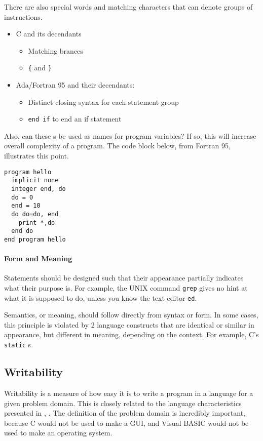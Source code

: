 There are also special words and matching characters that can denote groups of instructions.
\begin{itemize}[noitemsep]
\item C and its decendants
  \begin{itemize}[noitemsep]
  \item Matching brances
  \item \texttt{\{} and \texttt{\}}
  \end{itemize}
\item Ada/Fortran 95 and their decendants:
  \begin{itemize}[noitemsep]
  \item Distinct closing syntax for each statement group
  \item \texttt{end if} to end an if statement
  \end{itemize}
\end{itemize}

Also, can these s be used as names for program variables?
If so, this will increase overall complexity of a program.
The code block below, from Fortran 95, illustrates this point.
\begin{verbatim}
program hello
  implicit none
  integer end, do
  do = 0
  end = 10
  do do=do, end
    print *,do
  end do
end program hello
\end{verbatim}

\paragraph{Form and Meaning}\label{par:Syntax_Form_Meaning}
Statements should be designed such that their appearance partially indicates what their purpose is.
For example, the UNIX command \texttt{grep} gives no hint at what it is supposed to do, unless you know the text editor \texttt{ed}.

Semantics, or meaning, should follow directly from syntax or form.
In some cases, this principle is violated by 2 language constructs that are identical or similar in appearance, but different in meaning, depending on the context.
For example, C's \texttt{static} s.

\subsection{Writability}\label{subsec:Writability}
Writability is a measure of how easy it is to write a program in a language for a given problem domain.
This is closely related to the language characteristics presented in , .
The definition of the problem domain is incredibly important, because C would not be used to make a GUI, and Visual BASIC would not be used to make an operating system.

